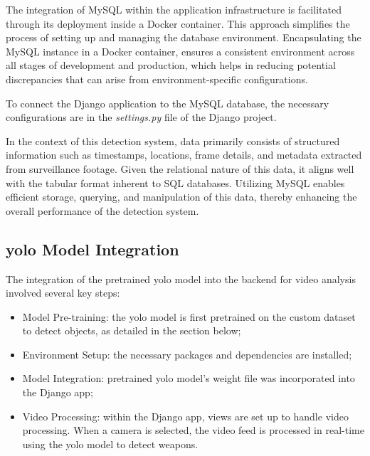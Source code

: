 The integration of MySQL within the application infrastructure is facilitated through its deployment inside a 
Docker container. This approach simplifies the process of setting up and managing the database 
environment. Encapsulating the MySQL instance in a Docker container, ensures a consistent environment 
across all stages of development and production, which helps in reducing potential discrepancies that 
can arise from environment-specific configurations.

To connect the Django application to the MySQL database, the necessary configurations are in the \textit{settings.py} 
file of the Django project.


In the context of this detection system, data primarily consists of structured information such as timestamps, 
locations, frame details, and metadata extracted from surveillance footage. Given the relational nature of this data, 
it aligns well with the tabular format inherent to SQL databases. Utilizing MySQL enables efficient storage, querying, 
and manipulation of this data, thereby enhancing the overall performance of the detection system.

\subsection{\ac{yolo} Model Integration}
The integration of the pretrained \ac{yolo} model into the backend for video analysis involved several key steps:

\begin{itemize}
    \item Model Pre-training: the \ac{yolo} model is first pretrained on the custom dataset to detect objects, 
    as detailed in the section below;
    \item Environment Setup: the necessary packages and dependencies are installed;
    \item Model Integration: pretrained \ac{yolo} model's weight file was incorporated into the Django app;
    \item Video Processing: within the Django app, views are set up to handle video processing. When a camera is 
    selected, the video feed is processed in real-time using the \ac{yolo} model to detect weapons.
\end{itemize}

